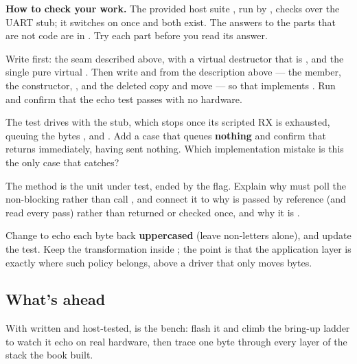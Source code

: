 \begin{aside}
\textbf{How to check your work.} The provided host suite , run
by , checks  over the UART stub; it switches on once
 and  both exist. The answers to the parts that
are not code are in . Try each part before you read its answer.
\end{aside}

\label{c10:ex:b1}

 Write  first: the  seam described
above, with a virtual  destructor that is , and the single pure
virtual . Then write  and
 from the description above --- the  member, the
constructor, , and the deleted copy and move --- so that 
implements . Run  and confirm that the echo test passes with no
hardware.

 The test drives  with the stub, which stops once its scripted RX is exhausted,
queuing the bytes ,  and . Add a case that queues \textbf{nothing}
and confirm that  returns immediately, having sent nothing. Which implementation mistake
is this the only case that catches?

 The method  is the unit under test, ended by the flag. Explain
why  must poll the non-blocking  rather than call , and
connect it to why  is passed by reference (and read every pass) rather than returned or checked once, and why
it is .

 Change  to echo each byte back \textbf{uppercased} (leave non-letters
alone), and update the test. Keep the transformation inside ; the point is that the
application layer is exactly where such policy belongs, above a driver that only moves bytes.

\subsection{What's ahead}
With  written and host-tested,  is the bench: flash it and
climb the bring-up ladder to watch it echo on real hardware, then trace one byte through every layer
of the stack the book built.

